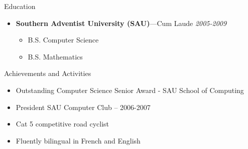 \documentclass[11pt,oneside]{article}
\newenvironment{ressection}[1]{
	\vspace{4pt}
	{\fontfamily{phv}\selectfont\Large#1}
	\begin{itemize}
	\vspace{3pt}
}{
	\end{itemize}
}
\newcommand{\resitem}[1]{
	\vspace{-4pt}
	\item \begin{flushleft} #1 \end{flushleft}
}
\newcommand{\resbigitem}[3]{
	\vspace{-5pt}
	\item
	{\textbf{#1}---#2 \hfill \textit{#3}}
}
\newenvironment{restitledposition}[3]{
	\resbigitem{#1}{#2}{#3}
	\vspace{-2pt}
	\begin{itemize}
}{
	\end{itemize}
}
\begin{document}
\begin{ressection}{Education}
	\begin{restitledposition}{Southern Adventist University (SAU)}{Cum Laude}{2005-2009}
		\resitem{B.S. Computer Science}
		\resitem{B.S. Mathematics}
	\end{restitledposition}
\end{ressection}


\begin{ressection}{Achievements and Activities}

	\resitem{Outstanding Computer Science Senior Award - SAU School of Computing}
	\resitem{President SAU Computer Club -- 2006-2007}
	\resitem{Cat 5 competitive road cyclist}
  \resitem{Fluently bilingual in French and English}

\end{ressection}
\end{document}
